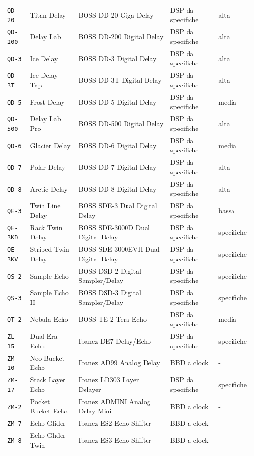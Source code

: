 \begin{xltabular}{\linewidth}{@{}l l X l l@{}}
\texttt{QD-20} & Titan Delay & BOSS DD-20 Giga Delay & DSP da specifiche & alta\\
\texttt{QD-200} & Delay Lab & BOSS DD-200 Digital Delay & DSP da specifiche & alta\\
\texttt{QD-3} & Ice Delay & BOSS DD-3 Digital Delay & DSP da specifiche & alta\\
\texttt{QD-3T} & Ice Delay Tap & BOSS DD-3T Digital Delay & DSP da specifiche & alta\\
\texttt{QD-5} & Frost Delay & BOSS DD-5 Digital Delay & DSP da specifiche & media\\
\texttt{QD-500} & Delay Lab Pro & BOSS DD-500 Digital Delay & DSP da specifiche & alta\\
\texttt{QD-6} & Glacier Delay & BOSS DD-6 Digital Delay & DSP da specifiche & media\\
\texttt{QD-7} & Polar Delay & BOSS DD-7 Digital Delay & DSP da specifiche & alta\\
\texttt{QD-8} & Arctic Delay & BOSS DD-8 Digital Delay & DSP da specifiche & alta\\
\texttt{QE-3} & Twin Line Delay & BOSS SDE-3 Dual Digital Delay & DSP da specifiche & bassa\\
\texttt{QE-3KD} & Rack Twin Delay & BOSS SDE-3000D Dual Digital Delay & DSP da specifiche & specifiche\\
\texttt{QE-3KV} & Striped Twin Delay & BOSS SDE-3000EVH Dual Digital Delay & DSP da specifiche & specifiche\\
\texttt{QS-2} & Sample Echo & BOSS DSD-2 Digital Sampler/Delay & DSP da specifiche & specifiche\\
\texttt{QS-3} & Sample Echo II & BOSS DSD-3 Digital Sampler/Delay & DSP da specifiche & specifiche\\
\texttt{QT-2} & Nebula Echo & BOSS TE-2 Tera Echo & DSP da specifiche & media\\
\texttt{ZL-15} & Dual Era Echo & Ibanez DE7 Delay/Echo & DSP da specifiche & specifiche\\
\texttt{ZM-10} & Neo Bucket Echo & Ibanez AD99 Analog Delay & BBD a clock & -\\
\texttt{ZM-17} & Stack Layer Echo & Ibanez LD303 Layer Delayer & DSP da specifiche & specifiche\\
\texttt{ZM-2} & Pocket Bucket Echo & Ibanez ADMINI Analog Delay Mini & BBD a clock & -\\
\texttt{ZM-7} & Echo Glider & Ibanez ES2 Echo Shifter & BBD a clock & -\\
\texttt{ZM-8} & Echo Glider Twin & Ibanez ES3 Echo Shifter & BBD a clock & -\\

\end{xltabular}
